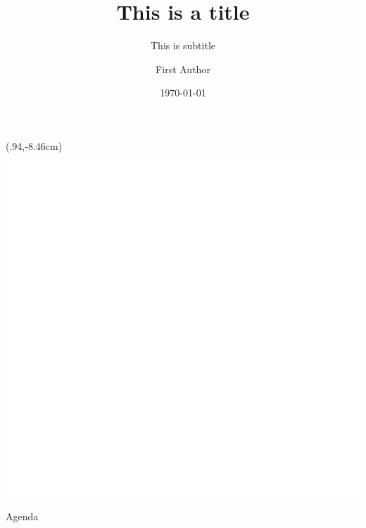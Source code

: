 
\renewcommand*{\bibfont}{\scriptsize}

\title{This is a title}
\author{First Author}
\date{{\scriptsize\today} \vspace{3em}}

\subtitle{This is subtitle}

{
	\begin{frame}[plain,t]%
		\date{}
		\titlepage
		\begin{textblock*}{200mm}(.94\textwidth,-8.46cm)
			\includegraphics[height=.98cm]{logo_white.png}
		\end{textblock*}
	\end{frame}
}

\begin{frame}[t]{Agenda}
\tableofcontents
\end{frame}

